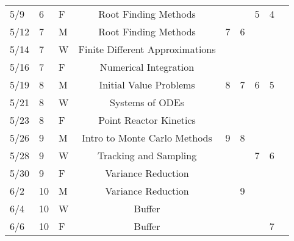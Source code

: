 \documentclass[11pt, a4paper]{article}
\begin{document}
\begin{table}[h]
\begin{center}
\begin{tabular}{lllcccccc}
5/9  & 6 & F & Root Finding Methods               &   &   & 5 & 4\\
5/12 & 7 & M & Root Finding Methods               & 7 & 6 &   &  \\
5/14 & 7 & W & Finite Different Approximations    &   &   &   &  \\
5/16 & 7 & F & Numerical Integration              &   &   &   &  \\
5/19 & 8 & M & Initial Value Problems             & 8 & 7 & 6 & 5\\
5/21 & 8 & W & Systems of ODEs                    &   &   &   &  \\
5/23 & 8 & F & Point Reactor Kinetics             &   &   &   &  \\
5/26 & 9 & M & Intro to Monte Carlo Methods       & 9 & 8 &   &  \\
5/28 & 9 & W & Tracking and Sampling              &   &   & 7 & 6\\
5/30 & 9 & F & Variance Reduction                 &   &   &   &  \\
6/2  & 10 & M & Variance Reduction                &   & 9 &   &  \\
6/4  & 10 & W & Buffer                            &   &   &   &  \\
6/6  & 10 & F & Buffer                            &   &   &   & 7\\
\end{tabular}
\end{center}
\end{table}
\FloatBarrier


\end{document}
